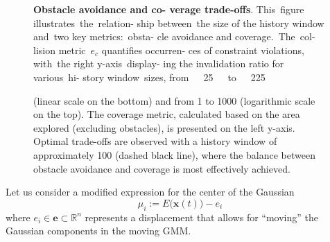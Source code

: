 \documentclass[letterpaper,10pt,conference,twoside]{IEEEtran}
\theoremstyle{definition}
\begin{document}
\begin{figure}[t!]
  \begin{minipage}[t!]{.26\columnwidth}
    \caption[Trade-offs between obstacle avoidance and coverage]{\textbf{Obstacle avoidance and co- verage trade-offs}. This~figure illustrates~the~relation- ship between~the size of the history window and~two key metrics:~obsta- cle avoidance and coverage.~The~col- lision metric~$e_c$ quantifies occurren- ces of constraint violations, with~the right y-axis~display- ing the invalidation ratio for various~hi- story window~sizes, from~~~25~~~to~~~225}
    \label{fig:0}
  \end{minipage}\hspace*{.3cm}
  \begin{minipage}[t!]{.7\columnwidth}
    \vspace*{-.3cm}
    
  \end{minipage}
  \vspace*{-.4cm}
  \caption*{\footnotesize (linear scale on the bottom) and from 1 to 1000 (logarithmic scale on the top). The coverage metric, calculated based on the area explored (excluding obstacles), is presented on the left y-axis. Optimal trade-offs are observed with a history window of approximately 100 (dashed black line), where the balance between obstacle avoidance and coverage is most effectively achieved.}
\end{figure}

Let us consider a modified expression for the center of the Gaussian
\begin{equation}
  \mu_i:=E\big(\mathbf{x}(t)\big)-e_i
\end{equation}
where $e_i\in\mathbf{e}\subset\mathbb{R}^n$ represents a displacement that allows for ``moving'' the Gaussian components in the moving GMM.
\end{document}
